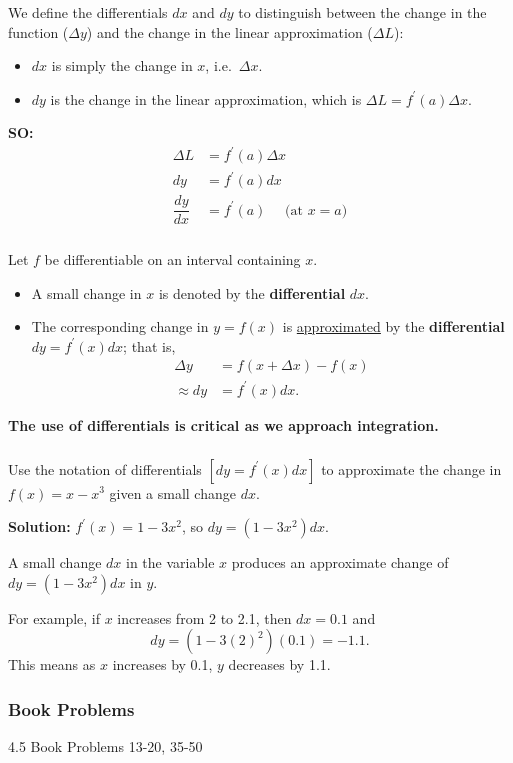 \documentclass[cal1spr16Lectures.tex]{subfiles}
\begin{document}
\begin{frame}
\small
We define the differentials $dx$ and $dy$ to distinguish between the \alert{change in the function ($\Delta y$)} and the \alert{change in the linear approximation ($\Delta L$)}: 
\begin{itemize}
\item $dx$ is simply the change in $x$, i.e.\ $\Delta x$.
\item $dy$ is the change in the linear approximation, which is $\Delta L=f^{\prime}(a) \Delta x$.
\end{itemize}

{\bf SO:}
\begin{align*}
\Delta L &= f^{\prime}(a) \Delta x \\[0.5pc]
dy &= f^{\prime}(a) dx \\[0.5pc]
\dfrac{dy}{dx} &= f^{\prime}(a)\quad \text{ (at $x=a$)}
\end{align*}
\end{frame}

\begin{frame}
\frametitle{}
\small
\begin{dfn} Let $f$ be differentiable on an interval containing $x$.
\begin{itemize}
\item A small change in $x$ is denoted by the {\bf differential} $dx$.
\item The corresponding change in $y=f(x)$ is \underline{approximated} by the {\bf differential} $dy=f^{\prime}(x)dx$; that is,
\begin{align*}
\Delta y& = f(x+\Delta x)-f(x) \\[0.5pc]
\approx dy &= f^{\prime}(x)dx.
\end{align*}
\end{itemize}
\end{dfn}

\vspace{1pc}
{\bf The use of differentials is critical as we approach integration.}
\end{frame}

\begin{frame}
\frametitle{}
\small
\begin{ex} Use the notation of differentials $[dy = f^{\prime}(x) dx]$ to approximate the change in $f(x)=x-x^3$ given a small change $dx$. \end{ex}

{\bf Solution:} $f^{\prime}(x)=1-3x^2$, so $dy=(1-3x^2)dx.$

A small change $dx$ in the variable $x$ produces an approximate change of $dy=(1-3x^2)dx$ in $y$.

\vspace{1.5pc}
For example, if $x$ increases from 2 to 2.1, then $dx=0.1$ and 
\[dy=\left(1-3(2)^2 \right)(0.1)=-1.1.\]
This means as $x$ increases by 0.1, $y$ decreases by 1.1.
\end{frame}

\subsubsection{Book Problems}

\begin{frame}
\begin{block}{4.5 Book Problems}
13-20, 35-50
\end{block}
\end{frame}
\end{document}
